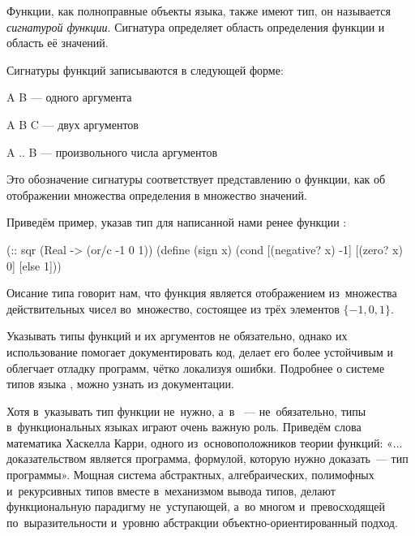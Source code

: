 %
Функции, как полноправные объекты языка, также имеют тип, он называется  \emph{сигнатурой функции}. Сигнатура определяет область определения функции и область её значений.


Сигнатуры функций записываются в следующей форме:
\vspace{-\medskipamount}
\begin{type}
   \item A \arrow B --- { одного аргумента}
   \item A B \arrow C --- { двух аргументов}
   \item A .. \arrow B --- { произвольного числа аргументов}
\end{type}
\medskip

Это обозначение сигнатуры соответствует представлению о функции, как об отображении множества определения в множество значений.


Приведём пример, указав тип для написанной нами ренее функции :
\begin{SchemeCode}
(:: sqr (Real -> (or/c -1 0 1))
 (define (sign x)
  (cond
    [(negative? x) -1]
    [(zero? x) 0]
    [else 1]))
\end{SchemeCode}
Оисание типа говорит нам, что функция  является отображением из~множества действительных чисел во~множество, состоящее из трёх элементов $\{-1,0,1\}$.

Указывать типы функций и их аргументов не обязательно, однако их использование помогает документировать код, делает его более устойчивым и облегчает отладку программ, чётко локализуя ошибки. Подробнее о системе типов языка \Scheme, можно узнать из документации.

Хотя в~\Scheme указывать тип функции не~нужно, а~в ~--- не~обязательно, типы в~функциональных языках играют очень важную роль. Приведём слова математика Хаскелла Карри, одного из~основоположников теории функций: «... доказательством является программа, формулой, которую нужно доказать~--- тип программы». Мощная система абстрактных, алгебраических, полимофных и~рекурсивных типов вместе в~механизмом вывода типов, делают функциональную парадигму не~уступающей, а~во многом и~превосходящей по~выразительности и~уровню абстракции объектно-ориентированный подход.




